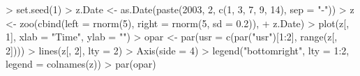 \begin{Schunk}
\begin{Sinput}
> set.seed(1)
> z.Date <- as.Date(paste(2003, 2, c(1, 3, 7, 9, 14), sep = "-"))
> z <- zoo(cbind(left = rnorm(5), right = rnorm(5, sd = 0.2)), 
+     z.Date)
> plot(z[, 1], xlab = "Time", ylab = "")
> opar <- par(usr = c(par("usr")[1:2], range(z[, 2])))
> lines(z[, 2], lty = 2)
> Axis(side = 4)
> legend("bottomright", lty = 1:2, legend = colnames(z))
> par(opar)
\end{Sinput}
\end{Schunk}
